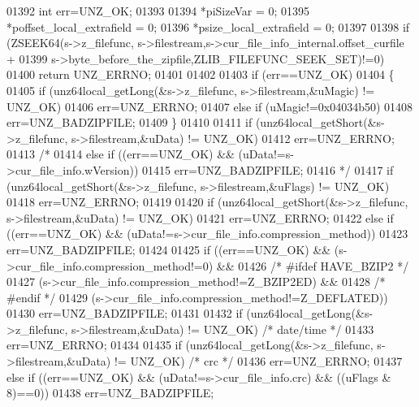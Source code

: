\begin{DoxyCode}
01392     \textcolor{keywordtype}{int} err=UNZ\_OK;
01393 
01394     *piSizeVar = 0;
01395     *poffset\_local\_extrafield = 0;
01396     *psize\_local\_extrafield = 0;
01397 
01398     \textcolor{keywordflow}{if} (ZSEEK64(s->z\_filefunc, s->filestream,s->cur\_file\_info\_internal.offset\_curfile +
01399                                 s->byte\_before\_the\_zipfile,ZLIB\_FILEFUNC\_SEEK\_SET)!=0)
01400         \textcolor{keywordflow}{return} UNZ\_ERRNO;
01401 
01402 
01403     \textcolor{keywordflow}{if} (err==UNZ\_OK)
01404     \{
01405         \textcolor{keywordflow}{if} (unz64local\_getLong(&s->z\_filefunc, s->filestream,&uMagic) != UNZ\_OK)
01406             err=UNZ\_ERRNO;
01407         \textcolor{keywordflow}{else} \textcolor{keywordflow}{if} (uMagic!=0x04034b50)
01408             err=UNZ\_BADZIPFILE;
01409     \}
01410 
01411     \textcolor{keywordflow}{if} (unz64local\_getShort(&s->z\_filefunc, s->filestream,&uData) != UNZ\_OK)
01412         err=UNZ\_ERRNO;
01413 \textcolor{comment}{/*}
01414 \textcolor{comment}{    else if ((err==UNZ\_OK) && (uData!=s->cur\_file\_info.wVersion))}
01415 \textcolor{comment}{        err=UNZ\_BADZIPFILE;}
01416 \textcolor{comment}{*/}
01417     \textcolor{keywordflow}{if} (unz64local\_getShort(&s->z\_filefunc, s->filestream,&uFlags) != UNZ\_OK)
01418         err=UNZ\_ERRNO;
01419 
01420     \textcolor{keywordflow}{if} (unz64local\_getShort(&s->z\_filefunc, s->filestream,&uData) != UNZ\_OK)
01421         err=UNZ\_ERRNO;
01422     \textcolor{keywordflow}{else} \textcolor{keywordflow}{if} ((err==UNZ\_OK) && (uData!=s->cur\_file\_info.compression\_method))
01423         err=UNZ\_BADZIPFILE;
01424 
01425     \textcolor{keywordflow}{if} ((err==UNZ\_OK) && (s->cur\_file\_info.compression\_method!=0) &&
01426 \textcolor{comment}{/* #ifdef HAVE\_BZIP2 */}
01427                          (s->cur\_file\_info.compression\_method!=Z\_BZIP2ED) &&
01428 \textcolor{comment}{/* #endif */}
01429                          (s->cur\_file\_info.compression\_method!=Z\_DEFLATED))
01430         err=UNZ\_BADZIPFILE;
01431 
01432     \textcolor{keywordflow}{if} (unz64local\_getLong(&s->z\_filefunc, s->filestream,&uData) != UNZ\_OK) \textcolor{comment}{/* date/time */}
01433         err=UNZ\_ERRNO;
01434 
01435     \textcolor{keywordflow}{if} (unz64local\_getLong(&s->z\_filefunc, s->filestream,&uData) != UNZ\_OK) \textcolor{comment}{/* crc */}
01436         err=UNZ\_ERRNO;
01437     \textcolor{keywordflow}{else} \textcolor{keywordflow}{if} ((err==UNZ\_OK) && (uData!=s->cur\_file\_info.crc) && ((uFlags & 8)==0))
01438         err=UNZ\_BADZIPFILE;

\end{DoxyCode}
